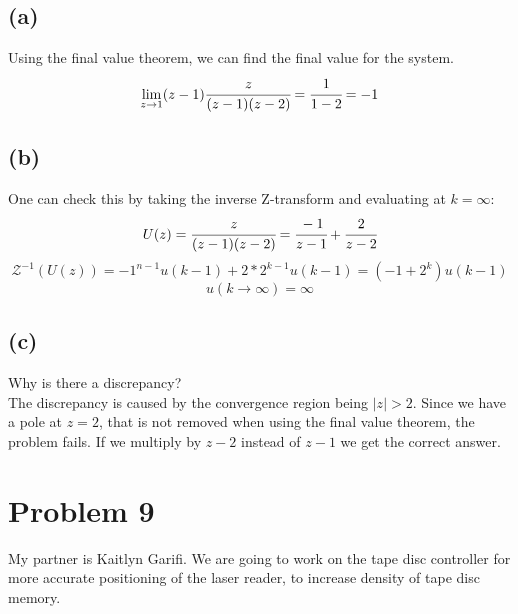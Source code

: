 \documentclass{article}
\begin{document}
\subsection*{(a)}
Using the final value theorem, we can find the final value for the system.
\[\lim_{z\to 1}(z-1)\cfrac{z}{(z-1)(z-2)}=\cfrac{1}{1-2}=-1\]

\subsection*{(b)}
One can check this by taking the inverse Z-transform and evaluating at $k=\infty$:
\[U(z)=\cfrac{z}{(z-1)(z-2)}=\cfrac{-1}{z-1}+\cfrac{2}{z-2}\]
\[\mathcal{Z}^{-1}(U(z))=-1^{n-1}u(k-1)+2*2^{k-1}u(k-1)=(-1+2^k)u(k-1)\]
\[u(k\to\infty)=\infty\]

\subsection*{(c)}
Why is there a discrepancy?\\
The discrepancy is caused by the convergence region being $\lvert z\rvert>2$. Since we have a pole at $z=2$, that is not removed when using the final value theorem, the problem fails. If we multiply by $z-2$ instead of $z-1$ we get the correct answer.

\section*{Problem 9}
My partner is Kaitlyn Garifi. We are going to work on the tape disc controller for more accurate positioning of the laser reader, to increase density of tape disc memory.

\appendix
\end{document}
